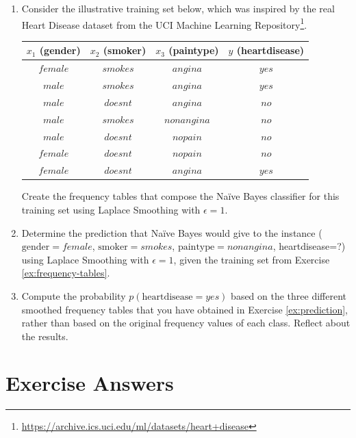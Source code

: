 \begin{enumerate}

\item \label{ex:frequency-tables} Consider the illustrative training set below, which was inspired by the real Heart Disease dataset from the UCI Machine Learning Repository\footnote{\url{https://archive.ics.uci.edu/ml/datasets/heart+disease}}.

\begin{center}
\begin{tabular}{|c|c|c||c|}\hline
$x_1$ (gender) & $x_2$ (smoker) & $x_3$ (paintype) & $y$ (heartdisease) \\ \hline
$female$ & $smokes$ & $angina$ & $yes$ \\ \hline
$male$ & $smokes$ & $angina$ & $yes$ \\ \hline
$male$ & $doesnt$ & $angina$ & $no$ \\ \hline
$male$ & $smokes$ & $nonangina$ & $no$ \\ \hline
$male$ & $doesnt$ & $nopain$ & $no$ \\ \hline
$female$ & $doesnt$ & $nopain$ & $no$ \\ \hline
$female$ & $doesnt$ & $angina$ & $yes$\\ \hline
\end{tabular} 
\end{center}

Create the frequency tables that compose the Na\"ive Bayes classifier for this training set using Laplace Smoothing with $\epsilon=1$. 

\item \label{ex:prediction} Determine the prediction that Na\"ive Bayes would give to the instance ($\text{gender}=female$, $\text{smoker}=smokes$, $\text{paintype}=nonangina$, heartdisease=?) using Laplace Smoothing with $\epsilon=1$, given the training set from Exercise \ref{ex:frequency-tables}.

\item \label{ex:laplace} Compute the probability $p(\text{heartdisease}=yes)$ based on the three different smoothed frequency tables that you have obtained in Exercise \ref{ex:prediction}, rather than based on the original frequency values of each class. Reflect about the results.

\end{enumerate}



\section{Exercise Answers}



